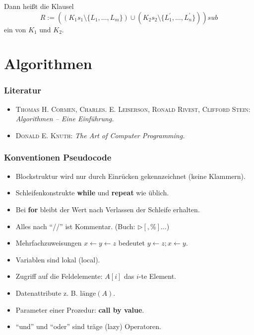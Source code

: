 \documentclass[a4paper,twoside,DIV15,BCOR12mm]{scrbook}
\begin{document}
Dann heißt die Klausel
$$ R:= ((K_1 s_1 \setminus \{L_1,\dots,L_m\})\cup
        (K_2 s_2 \setminus \{L_1^\prime,\dots,L_n^\prime\} ))sub $$
ein  von $K_1$ und $K_2$. 

\chapter{Algorithmen}

\subsection*{Literatur}
\begin{itemize}
\item \textsc{Thomas H. Cormen, Charles. E. Leiserson,
Ronald Rivest, Clifford Stein:} \emph{Algorithmen -- Eine Einführung.}
\item \textsc{Donald E. Knuth:} \emph{The Art of Computer Programming.} %
\end {itemize}

\subsection* {Konventionen Pseudocode}
\begin{itemize}
\item Blockstruktur wird nur durch Einrücken gekennzeichnet (keine Klammern).
\item Schleifenkonstrukte \textbf{while} und \textbf{repeat} wie üblich.
\item Bei \textbf{for} bleibt der Wert nach Verlassen der Schleife erhalten.
\item Alles nach "`//"' ist Kommentar. (Buch: $\rhd [, \%] \dots$)
\item Mehrfachzuweisungen $x \leftarrow y \leftarrow z$ bedeutet $y \leftarrow z; x \leftarrow y$.
\item Variablen sind lokal (local).
\item Zugriff auf die Feldelemente: $A[i]$ das $i$-te Element.
\item Datenattribute z. B. $\text{länge}(A)$.
\item Parameter einer Prozedur: \textbf{call by value}.
\item "`und"' und "`oder"' sind träge (lazy) Operatoren.
\end{itemize}
\end{document}
